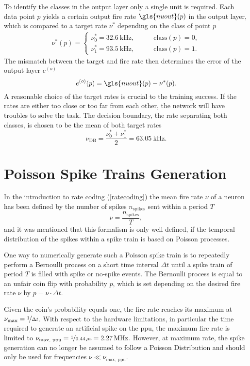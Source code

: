 To identify the classes in the output layer only a single unit is required. Each data point $p$ yields a certain output fire rate $\gls{nuout}(p)$ in the output layer, which is compared to a target rate $\nu^*$ depending on the class of point $p$
\begin{align}
\label{circlestarget}
\nu^*(p) =
\begin{cases}
\nu_0^* = \SI{32.6}{\kilo \Hz} ,&\quad \quad \text{class}(p) = 0,\\
\nu_1^* = \SI{93.5}{\kilo \Hz} ,&\quad \quad \text{class}(p) = 1.
\end{cases}
\end{align}
The mismatch between the target and fire rate then determines the error of the output layer $e^{(o)}$
\begin{equation}
e^{(o)}(p) = \gls{nuout}(p) - \nu^*(p).
\end{equation}
A reasonable choice of the target rates is crucial to the training success. If the rates are either too close or too far from each other, the network will have troubles to solve the task. The decision boundary, the rate separating both classes, is chosen to be the mean of both target rates
\begin{equation}
\nu_\text{DB} = \frac{\nu_0^* + \nu_1^*}{2} = \SI{63.05}{\kilo \Hz}.
\end{equation}


\section{Poisson Spike Trains Generation}
\label{poissonspiketrains}
In the introduction to rate coding (\cref{ratecoding}) the mean fire rate $\nu$ of a neuron has been defined by the number of spikes $n_\text{spikes}$ sent within a period $T$
\begin{equation}
\nu = \frac{n_\text{spikes}}{T},
\end{equation}
and it was mentioned that this formalism is only well defined, if the temporal distribution of the spikes within a spike train is based on Poisson processes.

One way to numerically generate such a Poisson spike train is to repeatedly perform a Bernoulli process on a short time interval $\Delta t$ until a spike train of period $T$ is filled with spike or no-spike events. The Bernoulli process is equal to an unfair coin flip with probability $p$, which is set depending on the desired fire rate $\nu$ by $p = \nu \cdot \Delta t$.

Given the coin's probability equals one, the fire rate reaches its maximum at $\nu_\text{max} = \nicefrac{1}{\Delta t}$. With respect to the hardware limitations, in particular the time required to generate an artificial spike on the \gls{ppu}, the maximum fire rate is limited to $\nu_\text{max, ppu} = \nicefrac{1}{\SI{0.44}{\mu \s}} = \SI{2.27}{\mega \Hz}$. However, at maximum rate, the spike generation can no longer be assumed to follow a Poisson Distribution and should only be used for frequencies $\nu \ll \nu_\text{max, ppu}$.

